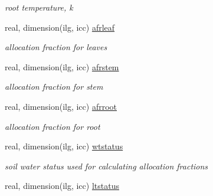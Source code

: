 \begin{DoxyCompactItemize}
\begin{DoxyCompactList}\small\item\em root temperature, k \end{DoxyCompactList}\item 
\hypertarget{structctem__statevars_1_1veg__gat_a8adfd7251dab79bac92e9b952c93f299}{}real, dimension(ilg, icc) \hyperlink{structctem__statevars_1_1veg__gat_a8adfd7251dab79bac92e9b952c93f299}{afrleaf}\label{structctem__statevars_1_1veg__gat_a8adfd7251dab79bac92e9b952c93f299}

\begin{DoxyCompactList}\small\item\em allocation fraction for leaves \end{DoxyCompactList}\item 
\hypertarget{structctem__statevars_1_1veg__gat_a48243608734e46eafd502931318d3e7e}{}real, dimension(ilg, icc) \hyperlink{structctem__statevars_1_1veg__gat_a48243608734e46eafd502931318d3e7e}{afrstem}\label{structctem__statevars_1_1veg__gat_a48243608734e46eafd502931318d3e7e}

\begin{DoxyCompactList}\small\item\em allocation fraction for stem \end{DoxyCompactList}\item 
\hypertarget{structctem__statevars_1_1veg__gat_a3ecc411e8e684d16a4a8519203904cb1}{}real, dimension(ilg, icc) \hyperlink{structctem__statevars_1_1veg__gat_a3ecc411e8e684d16a4a8519203904cb1}{afrroot}\label{structctem__statevars_1_1veg__gat_a3ecc411e8e684d16a4a8519203904cb1}

\begin{DoxyCompactList}\small\item\em allocation fraction for root \end{DoxyCompactList}\item 
\hypertarget{structctem__statevars_1_1veg__gat_a78db96c03b61c14a0fb334ea6e0cb72f}{}real, dimension(ilg, icc) \hyperlink{structctem__statevars_1_1veg__gat_a78db96c03b61c14a0fb334ea6e0cb72f}{wtstatus}\label{structctem__statevars_1_1veg__gat_a78db96c03b61c14a0fb334ea6e0cb72f}

\begin{DoxyCompactList}\small\item\em soil water status used for calculating allocation fractions \end{DoxyCompactList}\item 
\hypertarget{structctem__statevars_1_1veg__gat_a5f011d7696de0b047b3681d7478d5c63}{}real, dimension(ilg, icc) \hyperlink{structctem__statevars_1_1veg__gat_a5f011d7696de0b047b3681d7478d5c63}{ltstatus}\label{structctem__statevars_1_1veg__gat_a5f011d7696de0b047b3681d7478d5c63}


\end{DoxyCompactItemize}
